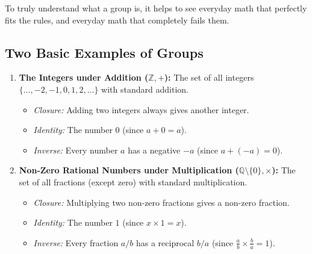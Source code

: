 \documentclass[12pt]{article}
\begin{document}
To truly understand what a group is, it helps to see everyday math that perfectly fits the rules, and everyday math that completely fails them.

\subsection*{Two Basic Examples of Groups}
\begin{enumerate}
    \item \textbf{The Integers under Addition ($\mathbb{Z}, +$):}
          The set of all integers $\{\dots, -2, -1, 0, 1, 2, \dots\}$ with standard addition.
          \begin{itemize}
              \item \textit{Closure:} Adding two integers always gives another integer.
              \item \textit{Identity:} The number $0$ (since $a + 0 = a$).
              \item \textit{Inverse:} Every number $a$ has a negative $-a$ (since $a + (-a) = 0$).
          \end{itemize}

    \item \textbf{Non-Zero Rational Numbers under Multiplication ($\mathbb{Q} \setminus \{0\}, \times$):}
          The set of all fractions (except zero) with standard multiplication.
          \begin{itemize}
              \item \textit{Closure:} Multiplying two non-zero fractions gives a non-zero fraction.
              \item \textit{Identity:} The number $1$ (since $x \times 1 = x$).
              \item \textit{Inverse:} Every fraction $a/b$ has a reciprocal $b/a$ (since $\frac{a}{b} \times \frac{b}{a} = 1$).
          \end{itemize}
\end{enumerate}
\end{document}
